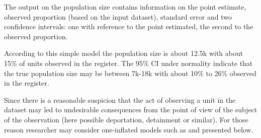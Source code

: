 \documentclass[
]{jss}
\newcommand{\1}{\mathcal{I}} \newcommand{\bZero}{\boldsymbol{0}}
\begin{document}
The output on the population size contains information on the point
estimate, observed proportion (based on the input dataset), standard
error and two confidence intervals: one with reference to the point
estimated, the second to the observed proportion.

According to this simple model the population size is about 12.5k with
about 15\% of units observed in the register. The 95\% CI under
normality indicate that the true population size may be between 7k-18k
with about 10\% to 26\% observed in the register.

Since there is a reasonable suspicion that the act of observing a unit
in the dataset may led to undesirable consequences from the point of
view of the subject of the observation (here possible deportation,
detainment or similar). For those reason researcher may consider
one-inflated models such as  and presented below.
\end{document}

